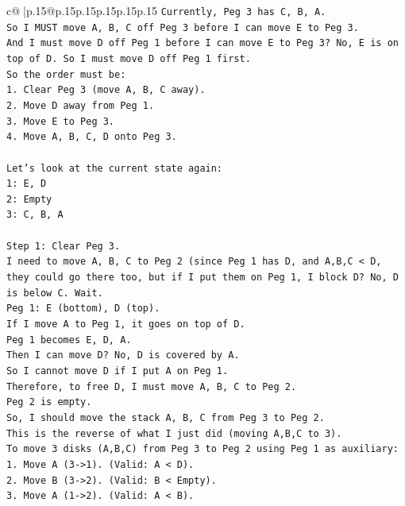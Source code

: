 \documentclass{article}
\begin{document}
{\begin{supertabular}{c@{$\;$}|p{.15\linewidth}@{}p{.15\linewidth}p{.15\linewidth}p{.15\linewidth}p{.15\linewidth}p{.15\linewidth}}
{{{\texttt{Currently, Peg 3 has C, B, A.} \\
\texttt{So I MUST move A, B, C off Peg 3 before I can move E to Peg 3.} \\
\texttt{And I must move D off Peg 1 before I can move E to Peg 3? No, E is on top of D. So I must move D off Peg 1 first.} \\
\texttt{So the order must be:} \\
\texttt{1. Clear Peg 3 (move A, B, C away).} \\
\texttt{2. Move D away from Peg 1.} \\
\texttt{3. Move E to Peg 3.} \\
\texttt{4. Move A, B, C, D onto Peg 3.} \\
\\ 
\texttt{Let's look at the current state again:} \\
\texttt{1: E, D} \\
\texttt{2: Empty} \\
\texttt{3: C, B, A} \\
\\ 
\texttt{Step 1: Clear Peg 3.} \\
\texttt{I need to move A, B, C to Peg 2 (since Peg 1 has D, and A,B,C < D, they could go there too, but if I put them on Peg 1, I block D? No, D is below C. Wait.} \\
\texttt{Peg 1: E (bottom), D (top).} \\
\texttt{If I move A to Peg 1, it goes on top of D.} \\
\texttt{Peg 1 becomes E, D, A.} \\
\texttt{Then I can move D? No, D is covered by A.} \\
\texttt{So I cannot move D if I put A on Peg 1.} \\
\texttt{Therefore, to free D, I must move A, B, C to Peg 2.} \\
\texttt{Peg 2 is empty.} \\
\texttt{So, I should move the stack A, B, C from Peg 3 to Peg 2.} \\
\texttt{This is the reverse of what I just did (moving A,B,C to 3).} \\
\texttt{To move 3 disks (A,B,C) from Peg 3 to Peg 2 using Peg 1 as auxiliary:} \\
\texttt{1. Move A (3{-}>1). (Valid: A < D).} \\
\texttt{2. Move B (3{-}>2). (Valid: B < Empty).} \\
\texttt{3. Move A (1{-}>2). (Valid: A < B).} \\
}}}
\end{supertabular}}
\end{document}
